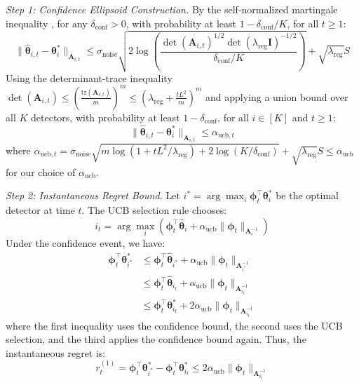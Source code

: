 \documentclass[11pt]{article}
\begin{document}
\textit{Step 1: Confidence Ellipsoid Construction.}
By the self-normalized martingale inequality \cite{Abbasi2011Improved}, for any $\delta_{\text{conf}} > 0$, with probability at least $1 - \delta_{\text{conf}}/K$, for all $t \geq 1$:
\begin{equation}
\|\hat{\boldsymbol{\theta}}_{i,t} - \boldsymbol{\theta}_i^*\|_{\mathbf{A}_{i,t}} \leq \sigma_{\text{noise}}\sqrt{2\log\left(\frac{\det(\mathbf{A}_{i,t})^{1/2} \det(\lambda_{\text{reg}}\mathbf{I})^{-1/2}}{\delta_{\text{conf}}/K}\right)} + \sqrt{\lambda_{\text{reg}}}S
\end{equation}
Using the determinant-trace inequality $\det(\mathbf{A}_{i,t}) \leq \left(\frac{\text{tr}(\mathbf{A}_{i,t})}{m}\right)^m \leq \left(\lambda_{\text{reg}} + \frac{tL^2}{m}\right)^m$ and applying a union bound over all $K$ detectors, with probability at least $1 - \delta_{\text{conf}}$, for all $i \in [K]$ and $t \geq 1$:
\begin{equation}
\|\hat{\boldsymbol{\theta}}_{i,t} - \boldsymbol{\theta}_i^*\|_{\mathbf{A}_{i,t}} \leq \alpha_{\text{ucb},t}
\end{equation}
where $\alpha_{\text{ucb},t} = \sigma_{\text{noise}}\sqrt{m\log(1 + tL^2/\lambda_{\text{reg}}) + 2\log(K/\delta_{\text{conf}})} + \sqrt{\lambda_{\text{reg}}}S \leq \alpha_{\text{ucb}}$ for our choice of $\alpha_{\text{ucb}}$.

\textit{Step 2: Instantaneous Regret Bound.}
Let $i^* = \arg\max_i \boldsymbol{\phi}_t^\top \boldsymbol{\theta}_i^*$ be the optimal detector at time $t$. The UCB selection rule chooses:
\begin{equation}
i_t = \arg\max_i \left( \boldsymbol{\phi}_t^\top \hat{\boldsymbol{\theta}}_i + \alpha_{\text{ucb}} \|\boldsymbol{\phi}_t\|_{\mathbf{A}_i^{-1}} \right)
\end{equation}
Under the confidence event, we have:
\begin{align}
\boldsymbol{\phi}_t^\top \boldsymbol{\theta}_{i^*}^* &\leq \boldsymbol{\phi}_t^\top \hat{\boldsymbol{\theta}}_{i^*} + \alpha_{\text{ucb}} \|\boldsymbol{\phi}_t\|_{\mathbf{A}_{i^*}^{-1}} \\
&\leq \boldsymbol{\phi}_t^\top \hat{\boldsymbol{\theta}}_{i_t} + \alpha_{\text{ucb}} \|\boldsymbol{\phi}_t\|_{\mathbf{A}_{i_t}^{-1}} \\
&\leq \boldsymbol{\phi}_t^\top \boldsymbol{\theta}_{i_t}^* + 2\alpha_{\text{ucb}} \|\boldsymbol{\phi}_t\|_{\mathbf{A}_{i_t}^{-1}}
\end{align}
where the first inequality uses the confidence bound, the second uses the UCB selection, and the third applies the confidence bound again. Thus, the instantaneous regret is:
\begin{equation}
r_t^{(1)} = \boldsymbol{\phi}_t^\top \boldsymbol{\theta}_{i^*}^* - \boldsymbol{\phi}_t^\top \boldsymbol{\theta}_{i_t}^* \leq 2\alpha_{\text{ucb}} \|\boldsymbol{\phi}_t\|_{\mathbf{A}_{i_t}^{-1}}
\end{equation}
\end{document}
